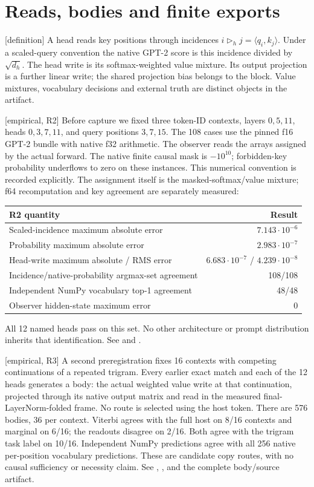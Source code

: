 \documentclass[11pt]{article}
\newcommand{\status}[1]{\textsf{[#1]}}
\begin{document}
\section{Reads, bodies and finite exports}

\status{definition} A head reads key positions through incidences
$i\mathbin{\triangleright_h}j=\langle q_i,k_j\rangle$. Under a scaled-query
convention the native GPT-2 score is this incidence divided by
$\sqrt{d_h}$. The head write is its softmax-weighted value mixture. Its output
projection is a further linear write; the shared projection bias belongs
to the block. Value mixtures, vocabulary decisions and external truth are
distinct objects in the artifact.

\status{empirical, R2} Before capture we fixed three token-ID contexts,
layers $0,5,11$, heads $0,3,7,11$, and query positions $3,7,15$.
The 108 cases use the pinned f16 GPT-2 bundle with native f32 arithmetic.
The observer reads the arrays assigned by the actual forward. The native
finite causal mask is $-10^{10}$; forbidden-key probability underflows to
zero on these instances. This numerical convention is recorded explicitly.
The assignment itself is the masked-softmax/value mixture; f64 recomputation
and key agreement are separately measured:
\begin{center}
\begin{tabular}{lr}
\toprule
R2 quantity & Result\\
\midrule
Scaled-incidence maximum absolute error & $7.143\cdot10^{-6}$\\
Probability maximum absolute error & $2.983\cdot10^{-7}$\\
Head-write maximum absolute / RMS error & $6.683\cdot10^{-7}$ / $4.239\cdot10^{-8}$\\
Incidence/native-probability argmax-set agreement & 108/108\\
Independent NumPy vocabulary top-1 agreement & 48/48\\
Observer hidden-state maximum error & 0\\
\bottomrule
\end{tabular}
\end{center}
All 12 named heads pass on this set. No other architecture or prompt
distribution inherits that identification. See
 and .

\status{empirical, R3} A second preregistration fixes 16 contexts with
competing continuations of a repeated trigram. Every earlier exact match
and each of the 12 heads generates a body: the actual weighted value write
at that continuation, projected through its native output matrix and read
in the measured final-LayerNorm-folded frame. No route is selected using
the host token. There are 576 bodies, 36 per context. Viterbi agrees with
the full host on 8/16 contexts and marginal on 6/16; the readouts disagree
on 2/16. Both agree with the trigram task label on 10/16. Independent NumPy
predictions agree with all 256 native per-position vocabulary predictions.
These are candidate copy routes, with no causal sufficiency or necessity
claim. See , , and the complete
 body/source artifact.
\end{document}
